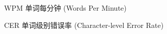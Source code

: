 
\begin{denotation}[3cm]
\item[WPM] 单词每分钟 (Words Per Minute)
\item[CER] 单词级别错误率 (Character-level Error Rate)
\end{denotation}





